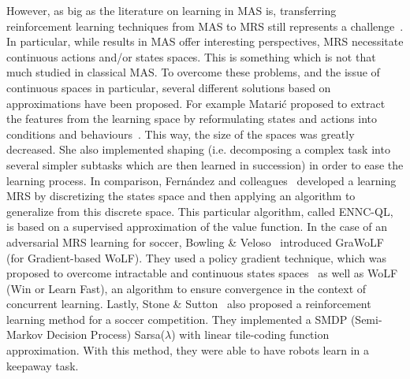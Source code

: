     However, as big as the literature on learning in MAS is, transferring reinforcement learning techniques from MAS to MRS still represents a challenge~\parencite{Yang2005}. In particular, while results in MAS offer interesting perspectives, MRS necessitate continuous actions and/or states spaces. This is something which is not that much studied in classical MAS. To overcome these problems, and the issue of continuous spaces in particular, several different solutions based on approximations have been proposed. For example Matarić proposed to extract the features from the learning space by reformulating states and actions into conditions and behaviours~\parencite{Mataric1997}. This way, the size of the spaces was greatly decreased. She also implemented shaping (i.e. decomposing a complex task into several simpler subtasks which are then learned in succession) in order to ease the learning process. In comparison, Fern\'{a}ndez and colleagues~\parencite{Fernandez2005} developed a learning MRS by discretizing the states space and then applying an algorithm to generalize from this discrete space. This particular algorithm, called ENNC-QL, is based on a supervised approximation of the value function. In the case of an adversarial MRS learning for soccer, Bowling \& Veloso~\parencite{Bowling2003} introduced GraWoLF (for Gradient-based WoLF). They used a policy gradient technique, which was proposed to overcome intractable and continuous states spaces~\parencite{Sutton2000} as well as WoLF (Win or Learn Fast), an algorithm to ensure convergence in the context of concurrent learning. Lastly, Stone \& Sutton~\parencite{Stone2001} also proposed a reinforcement learning method for a soccer competition. They implemented a SMDP (Semi-Markov Decision Process) Sarsa(\(\lambda\)) with linear tile-coding function approximation. With this method, they were able to have robots learn in a keepaway task.
     



